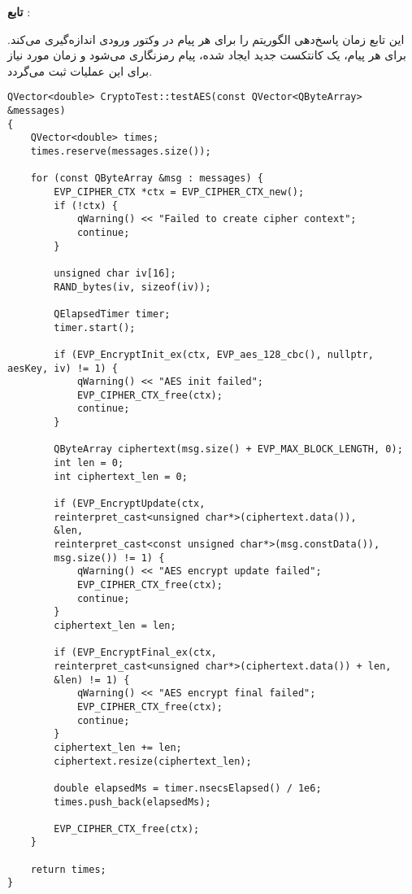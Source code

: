 \documentclass{report}
\begin{document}
\textbf{تابع }:

این تابع زمان پاسخ‌دهی الگوریتم  را برای هر پیام در وکتور ورودی اندازه‌گیری می‌کند. برای هر پیام، یک کانتکست جدید  ایجاد شده، پیام رمزنگاری می‌شود و زمان مورد نیاز برای این عملیات ثبت می‌گردد.
\begin{LTR}
    \begin{verbatim}
QVector<double> CryptoTest::testAES(const QVector<QByteArray> &messages)
{
    QVector<double> times;
    times.reserve(messages.size());

    for (const QByteArray &msg : messages) {
        EVP_CIPHER_CTX *ctx = EVP_CIPHER_CTX_new();
        if (!ctx) {
            qWarning() << "Failed to create cipher context";
            continue;
        }

        unsigned char iv[16];
        RAND_bytes(iv, sizeof(iv));

        QElapsedTimer timer;
        timer.start();

        if (EVP_EncryptInit_ex(ctx, EVP_aes_128_cbc(), nullptr, aesKey, iv) != 1) {
            qWarning() << "AES init failed";
            EVP_CIPHER_CTX_free(ctx);
            continue;
        }

        QByteArray ciphertext(msg.size() + EVP_MAX_BLOCK_LENGTH, 0);
        int len = 0;
        int ciphertext_len = 0;

        if (EVP_EncryptUpdate(ctx,
        reinterpret_cast<unsigned char*>(ciphertext.data()),
        &len,
        reinterpret_cast<const unsigned char*>(msg.constData()),
        msg.size()) != 1) {
            qWarning() << "AES encrypt update failed";
            EVP_CIPHER_CTX_free(ctx);
            continue;
        }
        ciphertext_len = len;

        if (EVP_EncryptFinal_ex(ctx,
        reinterpret_cast<unsigned char*>(ciphertext.data()) + len,
        &len) != 1) {
            qWarning() << "AES encrypt final failed";
            EVP_CIPHER_CTX_free(ctx);
            continue;
        }
        ciphertext_len += len;
        ciphertext.resize(ciphertext_len);

        double elapsedMs = timer.nsecsElapsed() / 1e6;
        times.push_back(elapsedMs);

        EVP_CIPHER_CTX_free(ctx);
    }

    return times;
}
    \end{verbatim}
\end{LTR}
\end{document}
